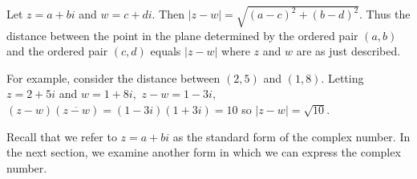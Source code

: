 Let $z=a+bi$ and $w=c+di.$ Then $\left| z-w\right| =\sqrt{\left(
a-c\right) ^{2}+\left( b-d\right) ^{2}}.$ Thus the distance between the
point in the plane determined by the ordered pair $\left( a,b\right) $ and
the ordered pair $\left( c,d\right) $ equals $\left| z-w\right| $ where $z$
and $w$ are as just described.

For example, consider the distance between $\left( 2,5\right) $ and $\left(
1,8\right) .$ Letting $z=2+5i$ and $w=1+8i,$ $z-w=1-3i$, $\left( z-w\right)
\left( \overline{z-w}\right) =\left( 1-3i\right) \left( 1+3i\right)
= 10$ so $\left\vert z-w\right\vert =\sqrt{10}$.

Recall that we refer to $z=a+bi$ as the standard form of the complex number. In the next section, 
we examine another form in which we can express the complex number. 
